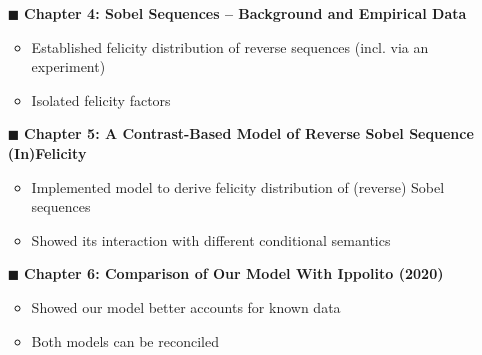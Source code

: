 \begin{frame}[t]
	\sectionpage\vskip 9pt
	\begin{itemize}
        \item[$\blacksquare$]	{\textbf{Chapter 4: Sobel Sequences -- Background and Empirical Data}}\vskip 4.5pt
            \begin{itemize}
                \item<2-> Established felicity distribution of reverse sequences (incl. via an experiment)\vskip 4.5pt
                \item<2-> Isolated felicity factors\vskip 9pt
            \end{itemize}
        \item[$\blacksquare$]	{\textbf{Chapter 5: A Contrast-Based Model of Reverse Sobel Sequence (In)Felicity}}\vskip 4.5pt
            \begin{itemize}
                \item<3-> Implemented model to derive felicity distribution of (reverse) Sobel sequences\vskip 4.5pt
                \item<3-> Showed its interaction with different conditional semantics\vskip 9pt
            \end{itemize}
        \item[$\blacksquare$]	\textbf{Chapter 6: Comparison of Our Model With Ippolito (2020)}\vskip 4.5pt
            \begin{itemize}
                \item<4-> Showed our model better accounts for known data\vskip 4.5pt
                \item<4-> Both models can be reconciled
            \end{itemize}
	\end{itemize}
\end{frame}